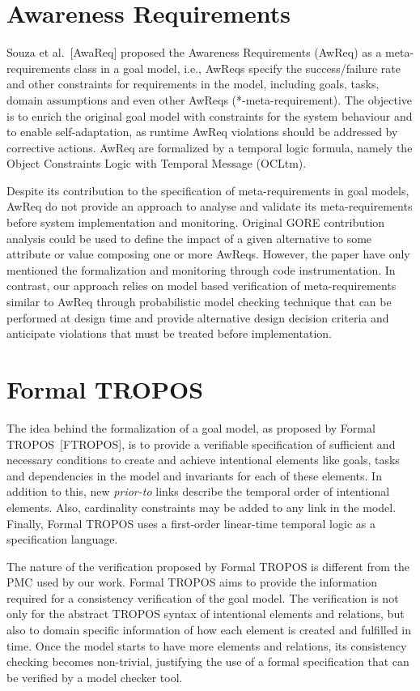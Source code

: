 \section{Awareness Requirements}

Souza et al.~[AwaReq] proposed the Awareness Requirements (AwReq) as a meta-requirements class in a goal model, i.e., AwReqs specify the success/failure rate and other constraints for requirements in the model, including goals, tasks, domain assumptions and even other AwReqs (*-meta-requirement). The objective is to enrich the original goal model with constraints for the system behaviour and to enable self-adaptation, as runtime AwReq violations should be addressed by corrective actions. AwReq are formalized by a temporal logic formula, namely the Object Constraints Logic with Temporal Message (OCLtm).

Despite its contribution to the specification of meta-requirements in goal models, AwReq do not provide an approach to analyse and validate its meta-requirements before system implementation and monitoring. Original GORE contribution analysis could be used to define the impact of a given alternative to some attribute or value composing one or more AwReqs. However, the paper have only mentioned the formalization and monitoring through code instrumentation. In contrast, our approach relies on model based verification of meta-requirements similar to AwReq through probabilistic model checking technique that can be performed at design time and provide alternative design decision criteria and anticipate violations that must be treated before implementation. 

\section{Formal TROPOS}

The idea behind the formalization of a goal model, as proposed by Formal TROPOS~[FTROPOS], is to provide a verifiable specification of sufficient and necessary conditions to create and achieve intentional elements like goals, tasks and dependencies in the model and invariants for each of these elements. In addition to this, new \textit{prior-to} links describe the temporal order of intentional elements. Also, cardinality constraints may be added to any link in the model. Finally, Formal TROPOS uses a first-order linear-time temporal logic as a specification language.

The nature of the verification proposed by Formal TROPOS is different from the PMC used by our work. Formal TROPOS aims to provide the information required for a consistency verification of the goal model. The verification is not only for the abstract TROPOS syntax of intentional elements and relations, but also to domain specific information of how each element is created and fulfilled in time. Once the model starts to have more elements and relations, its consistency checking becomes non-trivial, justifying the use of a formal specification that can be verified by a model checker tool. 

